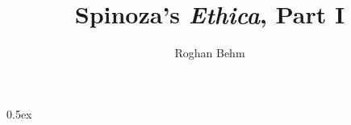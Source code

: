 \documentclass[11pt,a4paper]{article}
\begin{document}
\title{Spinoza's \emph{Ethica}, Part I}
\author{Roghan Behm}
\maketitle

\tableofcontents

\parindent 0pt\parskip 0.5ex



%
%
\end{document}
